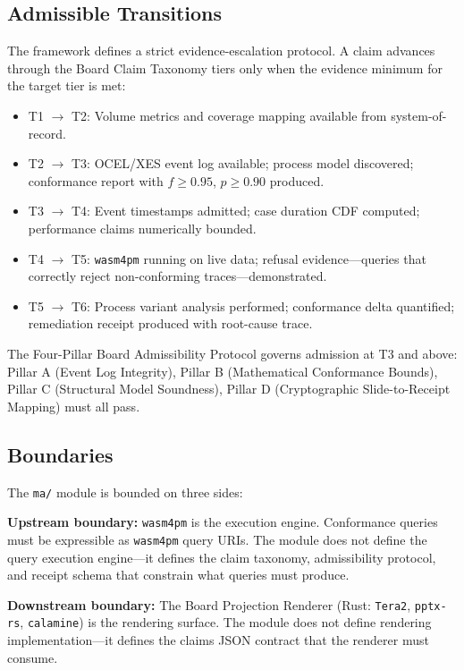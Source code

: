 \subsection{Admissible Transitions}
\label{sec:ma-arch-transitions}

The framework defines a strict evidence-escalation protocol. A claim advances through the
Board Claim Taxonomy tiers only when the evidence minimum for the target tier is met:

\begin{itemize}
  \item T1 $\to$ T2: Volume metrics and coverage mapping available from system-of-record.
  \item T2 $\to$ T3: OCEL/XES event log available; process model discovered; conformance
    report with $f \ge 0.95$, $p \ge 0.90$ produced.
  \item T3 $\to$ T4: Event timestamps admitted; case duration CDF computed; performance
    claims numerically bounded.
  \item T4 $\to$ T5: \texttt{wasm4pm} running on live data; refusal evidence---queries that
    correctly reject non-conforming traces---demonstrated.
  \item T5 $\to$ T6: Process variant analysis performed; conformance delta quantified;
    remediation receipt produced with root-cause trace.
\end{itemize}

The Four-Pillar Board Admissibility Protocol governs admission at T3 and above: Pillar A
(Event Log Integrity), Pillar B (Mathematical Conformance Bounds), Pillar C (Structural Model
Soundness), Pillar D (Cryptographic Slide-to-Receipt Mapping) must all pass.

\subsection{Boundaries}
\label{sec:ma-arch-boundaries}

The \texttt{ma/} module is bounded on three sides:

\textbf{Upstream boundary:} \texttt{wasm4pm} is the execution engine. Conformance queries
must be expressible as \texttt{wasm4pm} query URIs. The module does not define the query
execution engine---it defines the claim taxonomy, admissibility protocol, and receipt schema
that constrain what queries must produce.

\textbf{Downstream boundary:} The Board Projection Renderer (Rust: \texttt{Tera2},
\texttt{pptx-rs}, \texttt{calamine}) is the rendering surface. The module does not define
rendering implementation---it defines the claims JSON contract that the renderer must consume.

